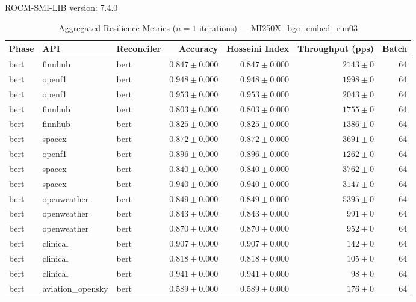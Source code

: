 ROCM-SMI-LIB version: 7.4.0

\begin{table}[htbp]
\caption{Aggregated Resilience Metrics ($n=1$ iterations) --- MI250X_bge_embed_run03}
\begin{tabular}{l l l r r r r}
\hline
Phase & API & Reconciler & Accuracy & Hosseini Index & Throughput (pps) & Batch \\
\hline
bert & finnhub & bert & $0.847\pm0.000$ & $0.847\pm0.000$ & $2143\pm0$ & 64 \\
bert & openf1 & bert & $0.948\pm0.000$ & $0.948\pm0.000$ & $1998\pm0$ & 64 \\
bert & openf1 & bert & $0.953\pm0.000$ & $0.953\pm0.000$ & $2043\pm0$ & 64 \\
bert & finnhub & bert & $0.803\pm0.000$ & $0.803\pm0.000$ & $1755\pm0$ & 64 \\
bert & finnhub & bert & $0.825\pm0.000$ & $0.825\pm0.000$ & $1386\pm0$ & 64 \\
bert & spacex & bert & $0.872\pm0.000$ & $0.872\pm0.000$ & $3691\pm0$ & 64 \\
bert & openf1 & bert & $0.896\pm0.000$ & $0.896\pm0.000$ & $1262\pm0$ & 64 \\
bert & spacex & bert & $0.840\pm0.000$ & $0.840\pm0.000$ & $3762\pm0$ & 64 \\
bert & spacex & bert & $0.940\pm0.000$ & $0.940\pm0.000$ & $3147\pm0$ & 64 \\
bert & openweather & bert & $0.849\pm0.000$ & $0.849\pm0.000$ & $5395\pm0$ & 64 \\
bert & openweather & bert & $0.843\pm0.000$ & $0.843\pm0.000$ & $991\pm0$ & 64 \\
bert & openweather & bert & $0.870\pm0.000$ & $0.870\pm0.000$ & $952\pm0$ & 64 \\
bert & clinical & bert & $0.907\pm0.000$ & $0.907\pm0.000$ & $142\pm0$ & 64 \\
bert & clinical & bert & $0.818\pm0.000$ & $0.818\pm0.000$ & $105\pm0$ & 64 \\
bert & clinical & bert & $0.941\pm0.000$ & $0.941\pm0.000$ & $98\pm0$ & 64 \\
bert & aviation\_opensky & bert & $0.589\pm0.000$ & $0.589\pm0.000$ & $176\pm0$ & 64 \\

\end{tabular}
\end{table}
